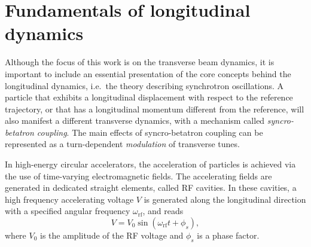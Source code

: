 
\section{Fundamentals of longitudinal dynamics} \label{sec:acc:longitudinal_dynamics}

Although the focus of this work is on the transverse beam dynamics, it is important to include an essential presentation of the core concepts behind the longitudinal dynamics, i.e.\ the theory describing synchrotron oscillations. A particle that exhibits a longitudinal displacement with respect to the reference trajectory, or that has a longitudinal momentum different from the reference, will also manifest a different transverse dynamics, with a mechanism called \textit{syncro-betatron coupling}. The main effects of syncro-betatron coupling can be represented as a turn-dependent \textit{modulation} of transverse tunes.

In high-energy circular accelerators, the acceleration of particles is achieved via the use of time-varying electromagnetic fields. The accelerating fields are generated in dedicated straight elements, called RF cavities. In these cavities, a high frequency accelerating voltage $V$ is generated along the longitudinal direction with a specified angular frequency $\omega_{\mathrm{rf}}$, and reads
\begin{equation}
    V=V_0 \sin \left(\omega_{\mathrm{rf}} t+\phi_s\right),
\end{equation}
where $V_0$ is the amplitude of the RF voltage and $\phi_s$ is a phase factor.

